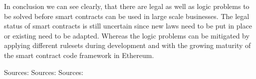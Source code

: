 In conclusion we can see clearly, that there are legal as well as logic problems to be solved before smart contracts can be used in large scale businesses. The legal status of smart contracts is still uncertain since new laws need to be put in place or existing need to be adapted. Whereas the logic problems can be mitigated by applying different rulesets during development and with the growing maturity of the smart contract code framework in Ethereum.

\begin{flushright}
Sources: 
Sources: 
Sources: 
\end{flushright}

\chapterend

